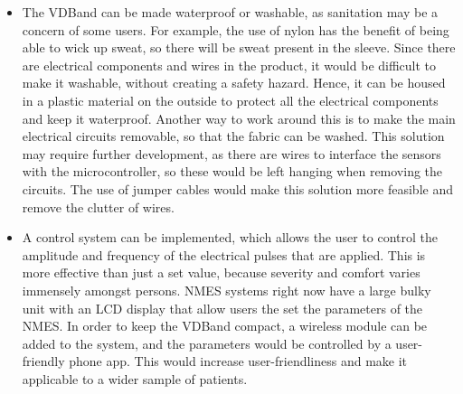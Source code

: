 \documentclass[11.5pt]{article}
\begin{document}
\begin{itemize}
    \item The VDBand can be made waterproof or washable, as sanitation may be a concern of some users. For example, the use of nylon has the benefit of being able to wick up sweat, so there will be sweat present in the sleeve. Since there are electrical components and wires in the product, it would be difficult to make it washable, without creating a safety hazard. Hence, it can be housed in a plastic material on the outside to protect all the electrical components and keep it waterproof. Another way to work around this is to make the main electrical circuits removable, so that the fabric can be washed. This solution may require further development, as there are wires to interface the sensors with the microcontroller, so these would be left hanging when removing the circuits. The use of jumper cables would make this solution more feasible and remove the clutter of wires. 
    
    \item A control system can be implemented, which allows the user to control the amplitude and frequency of the electrical pulses that are applied. This is more effective than just a set value, because severity and comfort varies immensely amongst persons. NMES systems right now have a large bulky unit with an LCD display that allow users the set the parameters of the NMES. In order to keep the VDBand compact, a wireless module can be added to the system, and the parameters would be controlled by a user-friendly phone app. This would increase user-friendliness and make it applicable to a wider sample of patients. 
    

\end{itemize}
\end{document}
